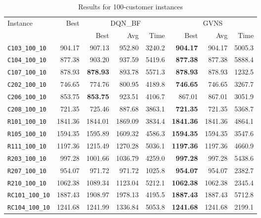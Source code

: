 \begin{table}[ht]
\centering
\small
\setlength{\tabcolsep}{5pt}
\caption{Results for 100-customer instances}
\vspace{4mm}
\begin{adjustbox}{width=\textwidth}
\begin{tabular}{l r r r r @{\hspace{8pt}} r r r @{\hspace{8pt}}}
\toprule
\multirow{2}{*}{Instance} & \multirow{2}{*}{Best} & \multicolumn{3}{c}{DQN\_BF} & \multicolumn{3}{c}{GVNS} \\
\cmidrule(lr){3-5} \cmidrule(lr){6-8}
 &  & Best & Avg & Time & Best & Avg & Time \\
\midrule
\texttt{C103\_100\_10} & 904.17 & 907.13 & 952.80 & 3240.2 & \textbf{904.17} & 904.17 & 5005.3 \\
\texttt{C104\_100\_10} & 877.38 & 903.20 & 937.59 & 5419.6 & \textbf{877.38} & 877.38 & 5888.4 \\
\texttt{C107\_100\_10} & 878.93 & \textbf{878.93} & 893.78 & 5571.3 & \textbf{878.93} & 878.93 & 1232.5 \\
\texttt{C202\_100\_10} & 746.65 & 774.76 & 800.95 & 4189.8 & \textbf{746.65} & 746.65 & 3267.7 \\
\texttt{C206\_100\_10} & 853.75 & \textbf{853.75} & 923.51 & 4106.7 & 867.01 & 867.01 & 3051.9 \\
\texttt{C208\_100\_10} & 721.35 & 725.46 & 887.68 & 3863.1 & \textbf{721.35} & 721.35 & 5368.7 \\
\texttt{R101\_100\_10} & 1841.36 & 1844.01 & 1869.09 & 3834.4 & \textbf{1841.36} & 1841.36 & 4864.1 \\
\texttt{R105\_100\_10} & 1594.35 & 1595.89 & 1609.32 & 4586.3 & \textbf{1594.35} & 1594.35 & 3547.6 \\
\texttt{R111\_100\_10} & 1197.36 & 1215.49 & 1270.28 & 5036.1 & \textbf{1197.36} & 1197.36 & 4660.9 \\
\texttt{R203\_100\_10} & 997.28 & 1001.66 & 1036.79 & 4259.0 & \textbf{997.28} & 997.28 & 5438.6 \\
\texttt{R207\_100\_10} & 954.07 & 971.72 & 971.72 & 1025.8 & \textbf{954.07} & 954.07 & 2382.7 \\
\texttt{R210\_100\_10} & 1062.38 & 1089.34 & 1123.04 & 5212.1 & \textbf{1062.38} & 1062.38 & 2345.4 \\
\texttt{RC101\_100\_10} & 1887.43 & 1908.97 & 1978.13 & 4195.5 & \textbf{1887.43} & 1887.43 & 5712.8 \\
\texttt{RC104\_100\_10} & 1241.68 & 1241.99 & 1336.84 & 5053.8 & \textbf{1241.68} & 1241.68 & 2199.1 \\

\end{tabular}
\end{adjustbox}
\end{table}
